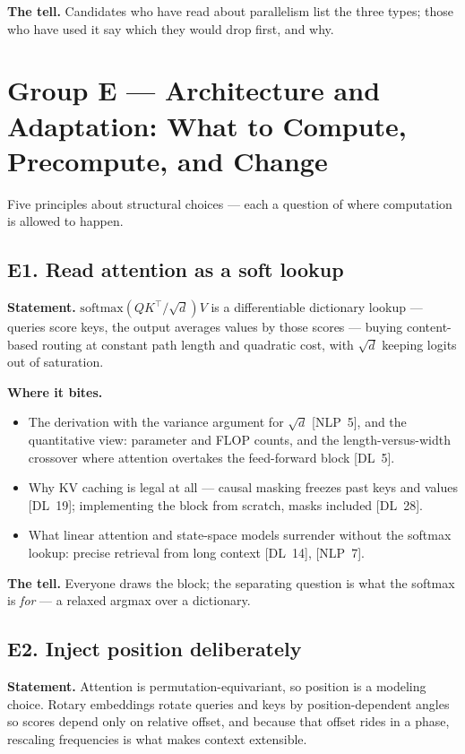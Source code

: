 \textbf{The tell.} Candidates who have read about parallelism list the three types; those who have used it say which they would drop first, and why.

\section*{Group E --- Architecture and Adaptation: What to Compute, Precompute, and Change}

Five principles about structural choices --- each a question of where computation is allowed to happen.

\subsection*{E1. Read attention as a soft lookup}

\textbf{Statement.} $\mathrm{softmax}(QK^\top/\sqrt{d})V$ is a differentiable dictionary lookup --- queries score keys, the output averages values by those scores --- buying content-based routing at constant path length and quadratic cost, with $\sqrt{d}$ keeping logits out of saturation.

\textbf{Where it bites.}
\begin{itemize}[itemsep=1pt,topsep=2pt,leftmargin=1.3em]
\item The derivation with the variance argument for $\sqrt{d}$ [NLP~5], and the quantitative view: parameter and FLOP counts, and the length-versus-width crossover where attention overtakes the feed-forward block [DL~5].
\item Why KV caching is legal at all --- causal masking freezes past keys and values [DL~19]; implementing the block from scratch, masks included [DL~28].
\item What linear attention and state-space models surrender without the softmax lookup: precise retrieval from long context [DL~14], [NLP~7].
\end{itemize}

\textbf{The tell.} Everyone draws the block; the separating question is what the softmax is \emph{for} --- a relaxed argmax over a dictionary.

\subsection*{E2. Inject position deliberately}

\textbf{Statement.} Attention is permutation-equivariant, so position is a modeling choice. Rotary embeddings rotate queries and keys by position-dependent angles so scores depend only on relative offset, and because that offset rides in a phase, rescaling frequencies is what makes context extensible.

